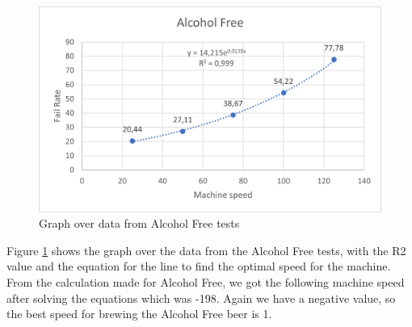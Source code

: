 \begin{center}
    \centering
    \begin{figure}[H]
        \includegraphics[width=1\textwidth]{img/AlcoholFree_graph.png}
        \caption{Graph over data from Alcohol Free tests}
        \label{fig:AlcoholFree_graph}
    \end{figure}
\end{center}

Figure \ref{fig:AlcoholFree_graph} shows the graph over the data from the Alcohol Free tests, with the R2 value and the equation for the line to find the optimal speed for the machine. \newline
From the calculation made for Alcohol Free, we got the following machine speed after solving the equations which was -198. Again we have a negative value, so the best speed for brewing the Alcohol Free beer is 1. \newline